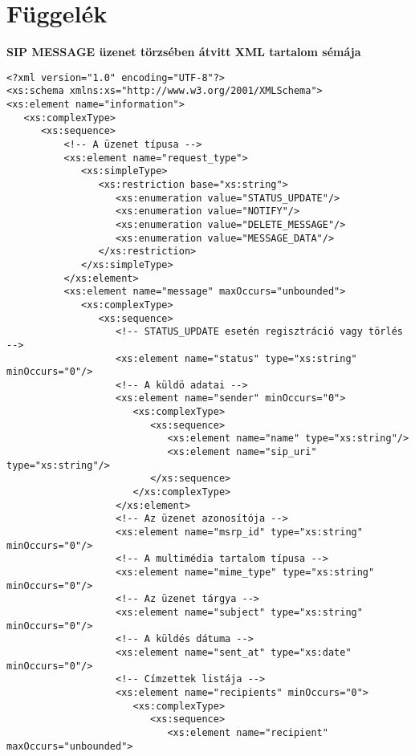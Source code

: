 
\appendix

\section{Függelék}
\label{sec:sipMsgXmlFuggelek}

\noindent
{\bf SIP MESSAGE üzenet törzsében átvitt XML tartalom sémája}
\fontsize{10}{10}
\begin{verbatim}
<?xml version="1.0" encoding="UTF-8"?>
<xs:schema xmlns:xs="http://www.w3.org/2001/XMLSchema"> 
<xs:element name="information">
   <xs:complexType>
      <xs:sequence>
          <!-- A üzenet típusa -->
          <xs:element name="request_type">
             <xs:simpleType>
                <xs:restriction base="xs:string">                        
                   <xs:enumeration value="STATUS_UPDATE"/>
                   <xs:enumeration value="NOTIFY"/>
                   <xs:enumeration value="DELETE_MESSAGE"/>
                   <xs:enumeration value="MESSAGE_DATA"/>
                </xs:restriction>
             </xs:simpleType>
          </xs:element>                                    
          <xs:element name="message" maxOccurs="unbounded">
             <xs:complexType>                    
                <xs:sequence>
                   <!-- STATUS_UPDATE esetén regisztráció vagy törlés -->
                   <xs:element name="status" type="xs:string" minOccurs="0"/>
                   <!-- A küldö adatai -->
                   <xs:element name="sender" minOccurs="0">
                      <xs:complexType>
                         <xs:sequence>
                            <xs:element name="name" type="xs:string"/>
                            <xs:element name="sip_uri" type="xs:string"/>
                         </xs:sequence>
                      </xs:complexType>
                   </xs:element>
                   <!-- Az üzenet azonosítója -->
                   <xs:element name="msrp_id" type="xs:string" minOccurs="0"/>
                   <!-- A multimédia tartalom típusa -->
                   <xs:element name="mime_type" type="xs:string" minOccurs="0"/>
                   <!-- Az üzenet tárgya -->
                   <xs:element name="subject" type="xs:string" minOccurs="0"/>
                   <!-- A küldés dátuma -->
                   <xs:element name="sent_at" type="xs:date" minOccurs="0"/>
                   <!-- Címzettek listája -->
                   <xs:element name="recipients" minOccurs="0">
                      <xs:complexType>
                         <xs:sequence>
                            <xs:element name="recipient" maxOccurs="unbounded">

\end{verbatim}
